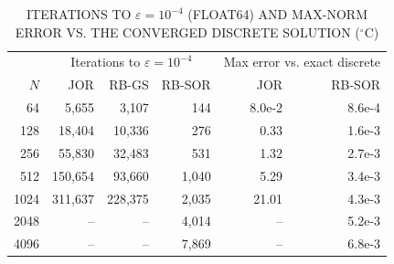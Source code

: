 \begin{table}[t]
\centering
\caption{ITERATIONS TO $\varepsilon = 10^{-4}$ (FLOAT64) AND MAX-NORM ERROR VS. THE CONVERGED DISCRETE SOLUTION ($^\circ$C)}
\label{tab:iters}
\begin{tabular}{rrrrrr}
\hline
\multicolumn{1}{c}{} & \multicolumn{3}{c}{Iterations to $\varepsilon = 10^{-4}$} & \multicolumn{2}{c}{Max error vs. exact discrete} \\
$N$ & JOR & RB-GS & RB-SOR & JOR & RB-SOR \\
\hline
64   & 5,655   & 3,107   & 144   & 8.0e-2 & 8.6e-4 \\
128  & 18,404  & 10,336  & 276   & 0.33   & 1.6e-3 \\
256  & 55,830  & 32,483  & 531   & 1.32   & 2.7e-3 \\
512  & 150,654 & 93,660  & 1,040 & 5.29   & 3.4e-3 \\
1024 & 311,637 & 228,375 & 2,035 & 21.01  & 4.3e-3 \\
2048 & --      & --      & 4,014 & --     & 5.2e-3 \\
4096 & --      & --      & 7,869 & --     & 6.8e-3 \\
\hline
\end{tabular}
\end{table}
